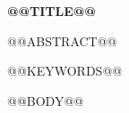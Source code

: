 \documentclass[UTF8,a4paper,11pt,scheme=plain]{ctexart}
\begin{document}
\begin{center}
{\LARGE\bfseries @@TITLE@@\par}
\end{center}
\vspace{.9em}
@@ABSTRACT@@\par
\vspace{.7em}
@@KEYWORDS@@\par
\vspace{.3em}
@@BODY@@
\end{document}
